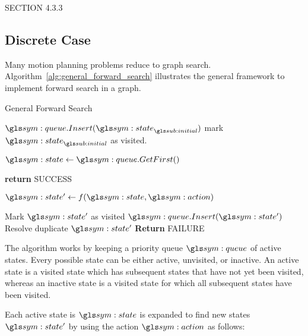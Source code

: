 		SECTION 4.3.3

	\subsection{Discrete Case}%
	\label{sec:discrete_case}


		Many motion planning problems reduce to graph search.
		Algorithm~\ref{alg:general_forward_search}  illustrates the general framework to implement forward
		search in a graph.

		\begin{algorithm}
			\caption{General Forward Search}\label{alg:general_forward_search}
			\begin{algorithmic}[1]

					\State{} $\queue.Insert(\state_{\initial})$
					\State{} mark $\state_{\initial}$ as visited.

					\While{$\queue \neq \emptyset$}

						\State{} $\state \gets \queue.GetFirst()$
						\If{$\state \in \statespace_{\goal}$}

							\State{} \textbf{return} SUCCESS

						\EndIf{}

						\ForAll{$\action \in \actionspace(\state)$}
							\State{} $\state' \gets f(\state, \action)$

								\State{} Mark $\state'$ as visited
								\State{} $\queue.Insert(\state')$
							\Else{}
								\State{} Resolve duplicate $\state'$
							\EndIf{}
						\EndFor{}
					\EndWhile{}
					\State{} \textbf{Return} FAILURE
				\EndProcedure{}
			\end{algorithmic}
		\end{algorithm}

		The algorithm works by keeping a priority queue $\queue$ of active
		states. Every possible state can be either active, unvisited, or
		inactive. An active state is a visited state which has subsequent states
		that have not yet been visited, whereas an inactive state is a visited
		state for which all subsequent states have been visited.

		Each active state is $\state$ is expanded to find new states $\state'$
		by using the action $\action$ as follows:

